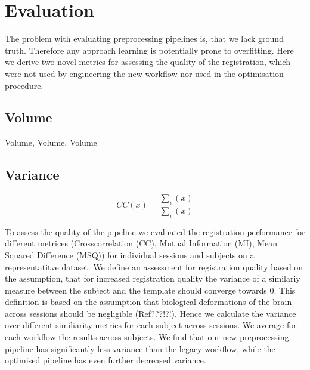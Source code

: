 \section{Evaluation}

The problem with evaluating preprocessing pipelines is, that we lack ground truth. Therefore any approach learning is potentially prone to overfitting. Here we derive two novel metrics for assessing the quality of the registration, which were not used by engineering the new workflow nor used in the optimisation procedure. 

\subsection{Volume}

Volume, Volume, Volume

\subsection{Variance}

\[ CC(x) = \frac{\sum_i{(x)}}{\sum_i{(x)}} \]


To assess the quality of the pipeline we evaluated the registration performance for different metrices (Crosscorrelation (CC), Mutual Information (MI), Mean Squared Difference (MSQ)) for individual sessions and subjects on a representatitve dataset.  We define an assessment for registration quality based on the assumption, that for increased registration quality the variance of a similariy measure between the subject and the template should converge towards 0. This definition is based on the assumption that biological deformations of the brain across sessions should be negligible (Ref???!?!). Hence we calculate the variance over different similiarity metrics for each subject across sessions. We average for each workflow the results across subjects. We find that our new preprocessing pipeline has significantly less variance than the legacy workflow, while the optimised pipeline has even further decreased variance.
